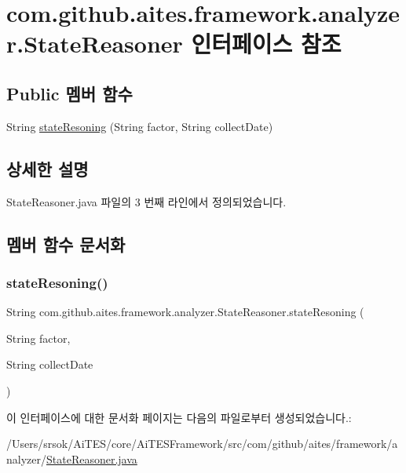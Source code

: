 \hypertarget{interfacecom_1_1github_1_1aites_1_1framework_1_1analyzer_1_1_state_reasoner}{}\section{com.\+github.\+aites.\+framework.\+analyzer.\+State\+Reasoner 인터페이스 참조}
\label{interfacecom_1_1github_1_1aites_1_1framework_1_1analyzer_1_1_state_reasoner}
\subsection*{Public 멤버 함수}
\begin{DoxyCompactItemize}
\item 
String \mbox{\hyperlink{interfacecom_1_1github_1_1aites_1_1framework_1_1analyzer_1_1_state_reasoner_a1c1f0dcbea07ba1137f32726265334f8}{state\+Resoning}} (String factor, String collect\+Date)
\end{DoxyCompactItemize}


\subsection{상세한 설명}


State\+Reasoner.\+java 파일의 3 번째 라인에서 정의되었습니다.



\subsection{멤버 함수 문서화}
\mbox{\label{interfacecom_1_1github_1_1aites_1_1framework_1_1analyzer_1_1_state_reasoner_a1c1f0dcbea07ba1137f32726265334f8}} 
\subsubsection{\texorpdfstring{state\+Resoning()}{stateResoning()}}
{\footnotesize\ttfamily String com.\+github.\+aites.\+framework.\+analyzer.\+State\+Reasoner.\+state\+Resoning (\begin{DoxyParamCaption}\item[{String}]{factor,  }\item[{String}]{collect\+Date }\end{DoxyParamCaption})}



이 인터페이스에 대한 문서화 페이지는 다음의 파일로부터 생성되었습니다.\+:\begin{DoxyCompactItemize}
\item 
/\+Users/srsok/\+Ai\+T\+E\+S/core/\+Ai\+T\+E\+S\+Framework/src/com/github/aites/framework/analyzer/\mbox{\hyperlink{_state_reasoner_8java}{State\+Reasoner.\+java}}\end{DoxyCompactItemize}
